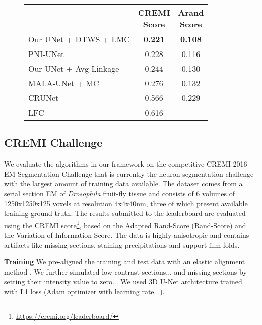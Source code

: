 \begin{figure}
\begin{minipage}[T]{0.48\textwidth}
\end{minipage}\hfill
\begin{minipage}[T]{0.48\textwidth}
    \centering
    \scriptsize
        \begin{tabular}{l|c|c}
         & \makecell{CREMI \\Score} & \makecell{Arand\\Score} \\ \midrule
Our UNet + DTWS + LMC &  \textbf{0.221} & \textbf{0.108}\\
PNI-UNet & 0.228 & 0.116 \\
Our UNet + \algname{} Avg-Linkage & 0.244 & 0.130 \\
MALA-UNet + MC \cite{funke2018large} & 0.276 & 0.132 \\
CRUNet \cite{zeng2017deepem3d} & 0.566 & 0.229 \\
LFC \cite{parag2017anisotropic} & 0.616 & \\
        \end{tabular}
    \label{tab:results_cremi_test}
\end{minipage}
\end{figure}

\subsection{CREMI Challenge} \label{sec:exp_first_comparison}
We evaluate the algorithms in our framework on the competitive CREMI 2016 EM Segmentation Challenge \cite{cremiChallenge} that is currently the neuron segmentation challenge with the largest amount of training data available. The dataset comes from a serial section EM of \emph{Drosophila} fruit-fly tissue and consists of 6 volumes of 1250x1250x125 voxels at resolution 4x4x40nm, three of which present available training ground truth. The results submitted to the leaderboard are evaluated using the CREMI score\footnote{\url{https://cremi.org/leaderboard/}}, based on the Adapted Rand-Score (Rand-Score) and the Variation of Information Score\cite{arganda2015crowdsourcing}. The data is highly anisotropic and contains artifacts like missing sections, staining precipitations and support film folds. 

\textbf{Training } We pre-aligned the training and test data with an elastic alignment method \cite{saalfeld2012elastic}. We further simulated low contrast sections... and missing sections by setting their intensity value to zero... We used 3D U-Net architecture \cite{ronneberger2015u,cciccek20163d} trained with L1 loss (Adam optimizer with learning rate...). 


